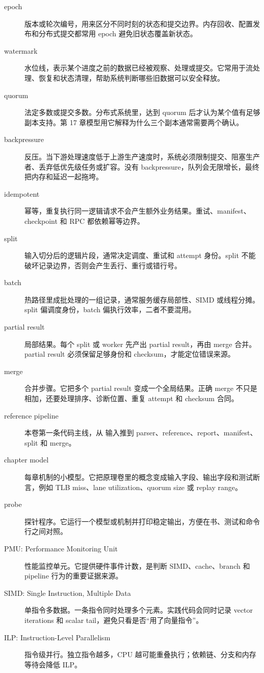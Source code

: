\begin{description}
  \item[epoch] 版本或轮次编号，用来区分不同时刻的状态和提交边界。内存回收、配置发布和分布式提交都常用 epoch 避免旧状态覆盖新状态。
  \item[watermark] 水位线，表示某个进度之前的数据已经被观察、处理或提交。它常用于流处理、恢复和状态清理，帮助系统判断哪些旧数据可以安全释放。
  \item[quorum] 法定多数或提交多数。分布式系统里，达到 quorum 后才认为某个值有足够副本支持。第 17 章模型用它解释为什么三个副本通常需要两个确认。
  \item[backpressure] 反压。当下游处理速度低于上游生产速度时，系统必须限制提交、阻塞生产者、丢弃低优先级任务或扩容。没有 backpressure，队列会无限增长，最终把内存和延迟一起拖垮。
  \item[idempotent] 幂等，重复执行同一逻辑请求不会产生额外业务结果。重试、manifest、checkpoint 和 RPC 都依赖幂等边界。
  \item[split] 输入切分后的逻辑片段，通常决定调度、重试和 attempt 身份。split 不能破坏记录边界，否则会产生丢行、重行或错行号。
  \item[batch] 热路径里成批处理的一组记录，通常服务缓存局部性、SIMD 或线程分摊。split 偏调度身份，batch 偏执行效率，二者不要混用。
  \item[partial result] 局部结果。每个 split 或 worker 先产出 partial result，再由 merge 合并。partial result 必须保留足够身份和 checksum，才能定位错误来源。
  \item[merge] 合并步骤。它把多个 partial result 变成一个全局结果。正确 merge 不只是相加，还要处理排序、诊断位置、重复 attempt 和 checksum 合同。
  \item[reference pipeline] 本卷第一条代码主线，从  输入推到 parser、reference、report、manifest、split 和 merge。
  \item[chapter model] 每章机制的小模型。它把原理卷里的概念变成输入字段、输出字段和测试断言，例如 TLB miss、lane utilization、quorum size 或 replay range。
  \item[probe] 探针程序。它运行一个模型或机制并打印稳定输出，方便在书、测试和命令行之间对照。
  \item[PMU: Performance Monitoring Unit] 性能监控单元。它提供硬件事件计数，是判断 SIMD、cache、branch 和 pipeline 行为的重要证据来源。
  \item[SIMD: Single Instruction, Multiple Data] 单指令多数据。一条指令同时处理多个元素。实践代码会同时记录 vector iterations 和 scalar tail，避免只看是否“用了向量指令”。
  \item[ILP: Instruction-Level Parallelism] 指令级并行。独立指令越多，CPU 越可能重叠执行；依赖链、分支和内存等待会降低 ILP。

\end{description}

